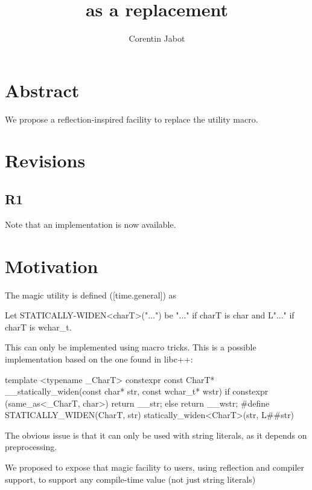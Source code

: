\documentclass{wg21}
\title{\tcode{define\_static\_string} as a \tcode{STATICALLY\_WIDEN} replacement}
\author{Corentin Jabot}{corentin.jabot@gmail.com}
\begin{document}
\maketitle

\section{Abstract}

We propose a reflection-inspired facility to replace the  utility macro.


\section{Revisions}

\subsection{R1}

Note that an implementation is now available.

\section{Motivation}


The  magic utility is defined ([time.general]) as

\begin{colorblock}
Let STATICALLY-WIDEN<charT>("...") be "..." if charT is char and L"..." if charT is wchar_t.
\end{colorblock}

This can only be implemented using macro tricks.
This is a possible implementation based on the one found in libc++:

\begin{colorblock}
template <typename _CharT>
constexpr const CharT* __statically_widen(const char* str, const wchar_t* wstr) {
    if constexpr (same_as<_CharT, char>)
      return __str;
    else
      return __wstr;
}
#define STATICALLY_WIDEN(CharT, str) statically_widen<CharT>(str, L##str)
\end{colorblock}

The obvious issue is that it can only be used with string literals, as it depends on preprocessing.

We proposed to expose that magic facility to users, using reflection and compiler support, to support any compile-time value (not just string literals)
\end{document}
